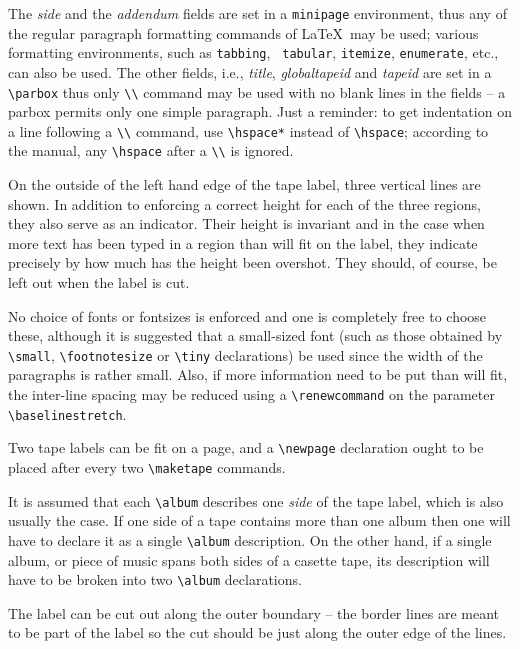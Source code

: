 The {\it side} and the {\it addendum} fields are set in a \verb|minipage|
environment, thus any of the regular paragraph formatting commands of \LaTeX\
may be used; various formatting environments, such as {\tt tabbing}, {\tt
tabular}, {\tt itemize}, {\tt enumerate}, etc., can also be used. The other
fields, i.e., {\it title}, {\it globaltapeid} and {\it tapeid} are set in a
\verb|\parbox| thus only \verb|\\| command may be used with no blank lines in
the fields -- a parbox permits only one simple paragraph. Just a reminder: to
get indentation on a line following a \verb|\\| command, use \verb|\hspace*|
instead of \verb|\hspace|; according to the manual, any \verb|\hspace| after
a \verb|\\| is ignored.

On the outside of the left hand edge of the tape label, three vertical lines
are shown. In addition to enforcing a correct height for each of the three
regions, they also serve as an indicator. Their height is invariant and in
the case when more text has been typed in a region than will fit on the
label, they indicate precisely by how much has the height been overshot. They
should, of course, be left out when the label is cut.

No choice of fonts or fontsizes is enforced and one is completely free to
choose these, although it is suggested that a small-sized font (such as those
obtained by \verb|\small|, \verb|\footnotesize| or \verb|\tiny| declarations)
be used since the width of the paragraphs is rather small. Also, if more
information need to be put than will fit, the inter-line spacing may be
reduced using a \verb|\renewcommand| on the parameter \verb|\baselinestretch|.

Two tape labels can be fit on a page, and a \verb|\newpage| declaration ought
to be placed after every two \verb|\maketape| commands.

It is assumed that each \verb|\album| describes one {\it side} of the tape
label, which is also usually the case. If one side of a tape contains more
than one album then one will have to declare it as a single \verb|\album|
description. On the other hand, if a single album, or piece of music spans
both sides of a casette tape, its description will have to be broken
into two \verb|\album| declarations.

The label can be cut out along the outer boundary -- the border lines are
meant to be part of the label so the cut should be just along the outer edge
of the lines.

